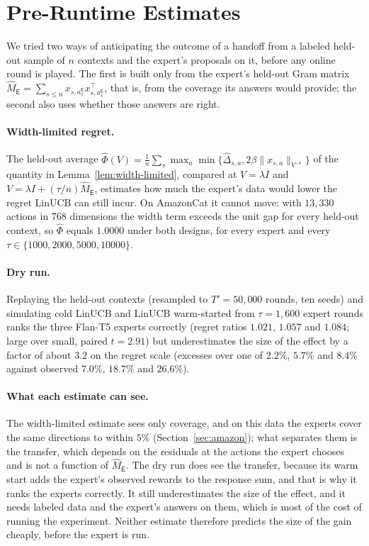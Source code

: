 \documentclass[anon]{alt2027} %
\newcommand{\Exp}{\mathsf{E}}
\begin{document}
\section{Pre-Runtime Estimates}
\label{app:diagnostics}

We tried two ways of anticipating the outcome of a handoff from a labeled
held-out sample of $n$ contexts and the expert's proposals on it, before any
online round is played. The first is built only from the expert's held-out
Gram matrix
$\widehat M_{\Exp}=\sum_{s\le n}x_{s,a_s^{\Exp}}x_{s,a_s^{\Exp}}^\top$, that is,
from the coverage its answers would provide; the second also uses whether
those answers are right.

\paragraph{Width-limited regret.} The held-out average
$\widehat\Phi(V)=\frac1n\sum_s\max_a\min\{\widehat\Delta_{s,a},2\beta\|x_{s,a}\|_{V^{-1}}\}$
of the quantity in Lemma~\ref{lem:width-limited}, compared at
$V=\lambda I$ and $V=\lambda I+(\tau/n)\widehat M_{\Exp}$, estimates how much
the expert's data would lower the regret LinUCB can still incur. On AmazonCat
it cannot move: with $13{,}330$ actions in $768$ dimensions the width term
exceeds the unit gap for every held-out context, so $\widehat\Phi$ equals
$1.0000$ under both designs, for every expert and every
$\tau\in\{1000,2000,5000,10000\}$.

\paragraph{Dry run.} Replaying the held-out contexts (resampled to
$T'=50{,}000$ rounds, ten seeds) and simulating cold LinUCB and LinUCB
warm-started from $\tau=1{,}600$ expert rounds ranks the three Flan-T5 experts
correctly (regret ratios $1.021$, $1.057$ and $1.084$; large over small,
paired $t=2.91$) but underestimates the size of the effect by a factor of
about $3.2$ on the regret scale (excesses over one of $2.2\%$, $5.7\%$ and
$8.4\%$ against observed $7.0\%$, $18.7\%$ and $26.6\%$).

\paragraph{What each estimate can see.} The width-limited estimate sees only
coverage, and on this data the experts cover the same directions to within
$5\%$ (Section~\ref{sec:amazon}); what separates them is the transfer, which
depends on the residuals at the actions the expert chooses and is not a
function of $\widehat M_{\Exp}$. The dry run does see the transfer, because
its warm start adds the expert's observed rewards to the response sum, and
that is why it ranks the experts correctly. It still underestimates the size
of the effect, and it needs labeled data and the expert's answers on them,
which is most of the cost of running the experiment. Neither estimate
therefore predicts the size of the gain cheaply, before the expert is
run.
\end{document}
